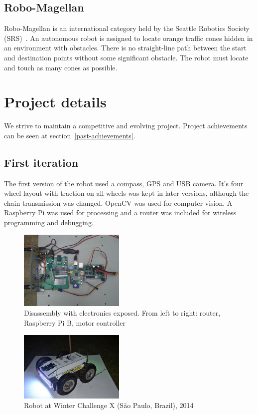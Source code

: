 \documentclass[conference]{IEEEtran}
\begin{document}
\subsection{Robo-Magellan}
Robo-Magellan is an international category held by the Seattle Robotics Society
(SRS)~\cite{SRS}. An autonomous robot is assigned to locate orange traffic cones
hidden in an environment with obstacles. There is no straight-line path between
the start and destination points without some significant obstacle. The robot
must locate and touch as many cones as possible.

\section{Project details}
\setcounter{subsection}{0}
We strive to maintain a competitive and evolving project. Project achievements
can be seen at section~\ref{past-achievements}.
\subsection{First iteration}
The first version of the robot used a compass, GPS and USB camera. It's four
wheel layout with traction on all wheels was kept in later versions, although
the chain transmission was changed. OpenCV was used for computer vision. A
Raspberry Pi was used for processing and a router was included for wireless
programming and debugging.

\begin{figure}[H]
    \centering
    \includegraphics[width=0.45\textwidth]{../Pictures/v1/WCX2014/DSC01671.JPG}
    \caption{Disassembly with electronics exposed. From left to right: router,
    Raspberry Pi B, motor controller}
\end{figure}

\begin{figure}[H]
    \centering
    \includegraphics[width=0.45\textwidth]{../Pictures/v1/WCX2014/14749170673_6e4bfca9fc_z.jpg}
    \caption{Robot at Winter Challenge X (São Paulo, Brazil), 2014}
\end{figure}
\end{document}
